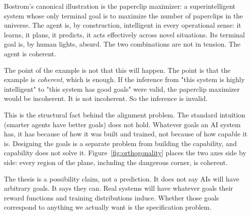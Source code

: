 Bostrom's canonical illustration is the paperclip maximizer: a superintelligent system whose only terminal goal is to maximize the number of paperclips in the universe. The agent is, by construction, intelligent in every operational sense: it learns, it plans, it predicts, it acts effectively across novel situations. Its terminal goal is, by human lights, absurd. The two combinations are not in tension. The agent is coherent.

The point of the example is not that this will happen. The point is that the example is \emph{coherent}, which is enough. If the inference from "this system is highly intelligent" to "this system has good goals" were valid, the paperclip maximizer would be incoherent. It is not incoherent. So the inference is invalid.

This is the structural fact behind the alignment problem. The standard intuition (smarter agents have better goals) does not hold. Whatever goals an AI system has, it has because of how it was built and trained, not because of how capable it is. Designing the goals is a separate problem from building the capability, and capability does not solve it. Figure~\ref{fig:orthogonality} places the two axes side by side: every region of the plane, including the dangerous corner, is coherent.

The thesis is a possibility claim, not a prediction. It does not say AIs will have arbitrary goals. It says they can. Real systems will have whatever goals their reward functions and training distributions induce. Whether those goals correspond to anything we actually want is the specification problem.

